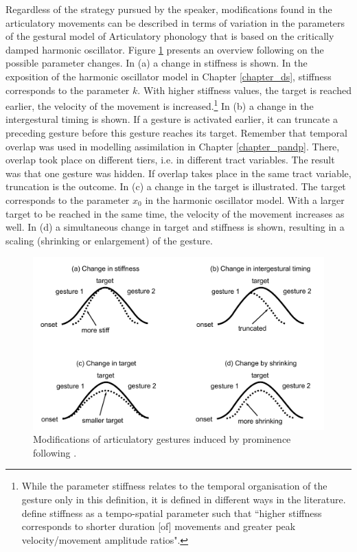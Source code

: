 Regardless of the strategy pursued by the speaker, modifications found in the articulatory movements can be described in terms of variation in the parameters of the gestural model of Articulatory phonology that is based on the critically damped harmonic oscillator. Figure \ref{fig:cho_2006} presents an overview following \citet{Cho2006} on the possible parameter changes. In (a) a change in stiffness is shown. In the exposition of the harmonic oscillator model in Chapter \ref{chapter_ds}, stiffness corresponds to the parameter $k$. With higher stiffness values, the target is reached earlier, the velocity of the movement is increased.\footnote{While the parameter stiffness relates to the temporal organisation of the gesture only in this definition, it is defined in different ways in the literature. \citet[465]{MunhallOstryParush1985} define stiffness as a tempo-spatial parameter such that  ``higher stiffness corresponds to shorter duration [of] movements and greater peak velocity/movement amplitude ratios".} In (b) a change in the intergestural timing is shown. If a gesture is activated earlier, it can truncate a preceding gesture before this gesture reaches its target. Remember that temporal overlap was used in modelling assimilation in Chapter \ref{chapter_pandp}. There, overlap took place on different tiers, i.e. in different tract variables. The result was that one gesture was hidden. If overlap takes place in the same tract variable, truncation is the outcome. In (c) a change in the target is illustrated. The target corresponds to the parameter $x_0$ in the harmonic oscillator model. With a larger target to be reached in the same time, the velocity of the movement increases as well. In (d) a simultaneous change in target and stiffness is shown, resulting in a scaling (shrinking or enlargement) of the gesture.

\begin{figure}
\includegraphics[width=\textwidth]{figures/ch4/cho_modifications.pdf}
\caption{Modifications of articulatory gestures induced by prominence following \citet{Cho2006}.}
\label{fig:cho_2006}
\end{figure}


